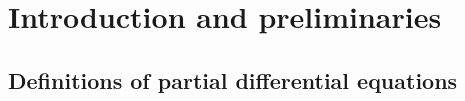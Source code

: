 \section{Introduction and preliminaries}

\subsection{Definitions of partial differential equations}

\begin{definition} 

\end{definition}